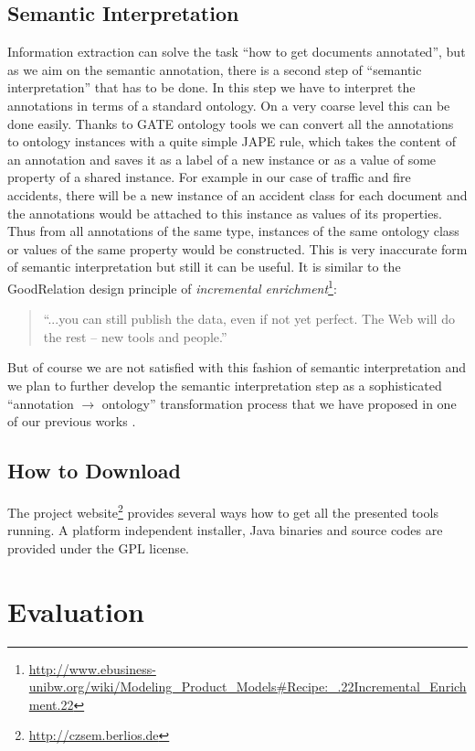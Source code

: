 \subsection{Semantic Interpretation}
\label{sec:SemanticInterpretation}
Information extraction can solve the task ``how to get documents annotated'', but as we aim on the semantic annotation, there is a second step of ``semantic interpretation'' that has to be done. In this step we have to interpret the annotations in terms of a standard ontology. On a very coarse level this can be done easily. Thanks to GATE ontology tools \citep{Bon04b} we can convert all the annotations to ontology instances with a quite simple JAPE \citep{Cunningham00jape:a} rule, which takes the content of an annotation and saves it as a label of a new instance or as a value of some property of a shared instance. For example in our case of traffic and fire accidents, there will be a new instance of an accident class for each document and the annotations would be attached to this instance as values of its properties. Thus from all annotations of the same type, instances of the same ontology class or values of the same property would be constructed. This is very inaccurate form of semantic interpretation but still it can be useful. It is similar to the GoodRelation \citep{DBLP:conf/ekaw/Hepp08} design principle of \emph{incremental enrichment}\footnote{
\url{http://www.ebusiness-unibw.org/wiki/Modeling_Product_Models#Recipe:_.22Incremental_Enrichment.22}
}:
\begin{quote}
``...you can still publish the data, even if not yet perfect. The Web will do the rest -- new tools and people.''	
\end{quote}

But of course we are not satisfied with this fashion of semantic interpretation and we plan to further develop the semantic interpretation step as a sophisticated ``annotation $\rightarrow$ ontology'' transformation process that we have proposed in one of our previous works \citep{biblio:DeVoComputingaggregations2008}.

\subsection{How to Download}
The project website\footnote{\url{http://czsem.berlios.de}} provides several ways how to get all the presented tools running. A platform independent installer, Java binaries and source codes are provided under the GPL license.


\section{Evaluation}
\label{sec:evaluation}

